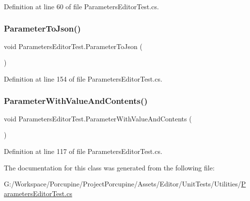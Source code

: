 Definition at line 60 of file Parameters\+Editor\+Test.\+cs.

\mbox{\label{class_parameters_editor_test_a12bcf53ee74ca0bc1ccf0faa4e17c7c4}} 
\subsubsection{\texorpdfstring{Parameter\+To\+Json()}{ParameterToJson()}}
{\footnotesize\ttfamily void Parameters\+Editor\+Test.\+Parameter\+To\+Json (\begin{DoxyParamCaption}{ }\end{DoxyParamCaption})}



Definition at line 154 of file Parameters\+Editor\+Test.\+cs.

\mbox{\label{class_parameters_editor_test_ac13921acfbf1e03f2b30b02b4dba5934}} 
\subsubsection{\texorpdfstring{Parameter\+With\+Value\+And\+Contents()}{ParameterWithValueAndContents()}}
{\footnotesize\ttfamily void Parameters\+Editor\+Test.\+Parameter\+With\+Value\+And\+Contents (\begin{DoxyParamCaption}{ }\end{DoxyParamCaption})}



Definition at line 117 of file Parameters\+Editor\+Test.\+cs.



The documentation for this class was generated from the following file\+:\begin{DoxyCompactItemize}
\item 
G\+:/\+Workspace/\+Porcupine/\+Project\+Porcupine/\+Assets/\+Editor/\+Unit\+Tests/\+Utilities/\hyperlink{_parameters_editor_test_8cs}{Parameters\+Editor\+Test.\+cs}\end{DoxyCompactItemize}
